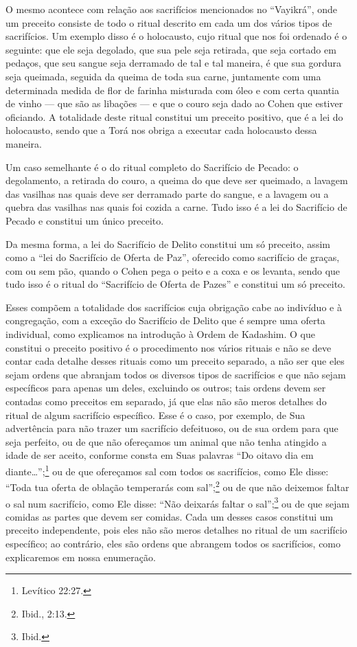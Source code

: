 O mesmo acontece com relação aos sacrifícios mencionados no
``Vayikrá'', onde um preceito consiste de todo o ritual descrito em
cada um dos vários tipos de sacrifícios. Um exemplo disso é o
holocausto, cujo ritual que nos foi ordenado é o seguinte: que ele seja
degolado, que sua pele seja retirada, que seja cortado em pedaços, que
seu sangue seja derramado de tal e tal maneira, é que sua gordura seja
queimada, seguida da queima de toda sua carne, juntamente com uma
determinada medida de flor de farinha misturada com óleo e com certa
quantia de vinho --- que são as libações --- e que o couro seja dado ao
Cohen que estiver oficiando. A totalidade deste ritual constitui um
preceito positivo, que é a lei do holocausto, sendo que a Torá nos
obriga a executar cada holocausto dessa maneira.

Um caso semelhante é o do ritual completo do Sacrifício de Pecado:
o degolamento, a retirada do couro, a queima do que deve ser queimado, a
lavagem das vasilhas nas quais deve ser derramado parte do sangue, e a
lavagem ou a quebra das vasilhas nas quais foi cozida a carne. Tudo
isso é a lei do Sacrifício de Pecado e constitui um único preceito.

Da mesma forma, a lei do Sacrifício de Delito constitui um só preceito,
assim como a ``lei do Sacrifício de Oferta de Paz'', oferecido como
sacrifício de graças, com ou sem pão, quando o Cohen pega o peito e
a coxa e os levanta, sendo que tudo isso é o ritual do ``Sacrifício de
Oferta de Pazes'' e
constitui um só preceito.

Esses compõem a totalidade dos sacrifícios cuja obrigação cabe ao
indivíduo e à congregação, com a exceção do Sacrifício de Delito que é
sempre uma oferta individual, como explicamos na introdução à Ordem de
Kadashim.
O que constitui o preceito positivo é o procedimento nos vários rituais
e não se deve contar cada detalhe desses rituais como um preceito
separado, a não
ser que eles sejam ordens que abranjam todos os diversos tipos de
sacrifícios e que não sejam específicos para apenas um deles, excluindo
os outros; tais ordens devem ser contadas como preceitos em separado,
já que elas não são meros detalhes do ritual de algum sacrifício
específico. Esse é o caso, por exemplo, de Sua advertência para não
trazer um sacrifício defeituoso, ou de sua ordem para que seja
perfeito, ou de que não ofereçamos um animal que não tenha atingido a
idade de ser aceito, conforme consta em Suas palavras ``Do oitavo dia
em diante\ldots{}'';\footnote{Levítico 22:27.} ou de que ofereçamos sal com todos os
sacrifícios, como Ele disse: ``Toda tua oferta de oblação temperarás com
sal'';\footnote{Ibid., 2:13.} ou de que não deixemos faltar o sal num sacrifício,
como Ele disse: ``Não deixarás faltar o sal'';\footnote{Ibid.} ou de que sejam
comidas as partes que devem ser comidas. Cada um desses casos constitui
um preceito independente, pois eles não são meros detalhes no ritual de
um sacrifício específico; ao contrário, eles são ordens que abrangem
todos os sacrifícios, como explicaremos em nossa enumeração.


